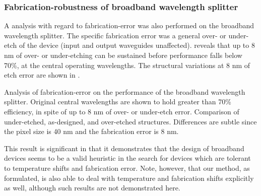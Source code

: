 \subsubsection{Fabrication-robustness of broadband wavelength splitter}
A analysis with regard to fabrication-error
    was also performed on the broadband wavelength splitter.
The specific fabrication error was a general over- or under-etch
    of the device (input and output waveguides unaffected)\cite{robust1}.
 reveals that up to 8 nm of over- or under-etching
    can be sustained before performance falls below 70\%, at the central
    operating wavelengths.
The structural variations at 8 nm of etch error are shown in .
    
    {Analysis of fabrication-error on the performance of the broadband 
    wavelength splitter.
    Original central wavelengths are shown to hold greater than 70\% efficiency,
    in spite of up to 8 nm of over- or under-etch error.}
    {Comparison of under-etched, as-designed, and over-etched structures.
    Differences are subtle since the pixel size is 40 nm and the
    fabrication error is 8 nm.}

This result is significant in that it demonstrates
    that the design of broadband devices
    seems to be a valid heuristic in the search for 
    devices which are tolerant to temperature shifts and fabrication error.
Note, however, that our method, as formulated, is also able to
    deal with temperature and fabrication shifts explicitly as well,
    although such results are not demonstrated here.

% 
% 
% 
